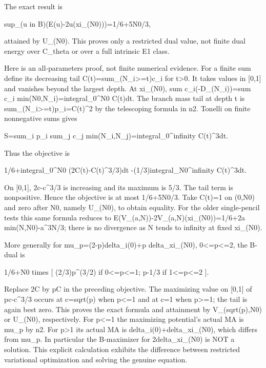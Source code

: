 \documentclass[11pt]{article}
\begin{document}
The exact result is

sup\_(u in B)(E(u)-2u(xi\_(N0)))=1/6+5N0/3,

attained by U\_(N0). This proves only a restricted dual value, not finite dual energy over C\_theta or over a full intrinsic E1 class.

Here is an all-parameters proof, not finite numerical evidence. For a finite sum define its decreasing tail C(t)=sum\_(N\_i>=t)c\_i for t>0. It takes values in [0,1] and vanishes beyond the largest depth. At xi\_(N0), sum c\_i(-D\_(N\_i))=sum c\_i min(N0,N\_i)=integral\_0\textasciicircum{}N0 C(t)dt. The branch mass tail at depth t is sum\_(N\_i>=t)p\_i=C(t)\textasciicircum{}2 by the telescoping formula in n2. Tonelli on finite nonnegative sums gives

S=sum\_i p\_i sum\_j c\_j min(N\_i,N\_j)=integral\_0\textasciicircum{}infinity C(t)\textasciicircum{}3dt.

Thus the objective is

1/6+integral\_0\textasciicircum{}N0 (2C(t)-C(t)\textasciicircum{}3/3)dt
      -(1/3)integral\_N0\textasciicircum{}infinity C(t)\textasciicircum{}3dt.

On [0,1], 2c-c\textasciicircum{}3/3 is increasing and its maximum is 5/3. The tail term is nonpositive. Hence the objective is at most 1/6+5N0/3. Take C(t)=1 on (0,N0) and zero after N0, namely U\_(N0), to obtain equality. For the older single-pencil tests this same formula reduces to E(V\_(a,N))-2V\_(a,N)(xi\_(N0))=1/6+2a min(N,N0)-a\textasciicircum{}3N/3; there is no divergence as N tends to infinity at fixed xi\_(N0).

More generally for mu\_p=(2-p)delta\_i(0)+p delta\_xi\_(N0), 0<=p<=2, the B-dual is

1/6+N0 times [ (2/3)p\textasciicircum{}(3/2) if 0<=p<=1;
                      p-1/3 if 1<=p<=2 ].

Replace 2C by pC in the preceding objective. The maximizing value on [0,1] of pc-c\textasciicircum{}3/3 occurs at c=sqrt(p) when p<=1 and at c=1 when p>=1; the tail is again best zero. This proves the exact formula and attainment by V\_(sqrt(p),N0) or U\_(N0), respectively. For p<=1 the maximizing potential's actual MA is mu\_p by n2. For p>1 its actual MA is delta\_i(0)+delta\_xi\_(N0), which differs from mu\_p. In particular the B-maximizer for 2delta\_xi\_(N0) is NOT a solution. This explicit calculation exhibits the difference between restricted variational optimization and solving the genuine equation.
\end{document}
